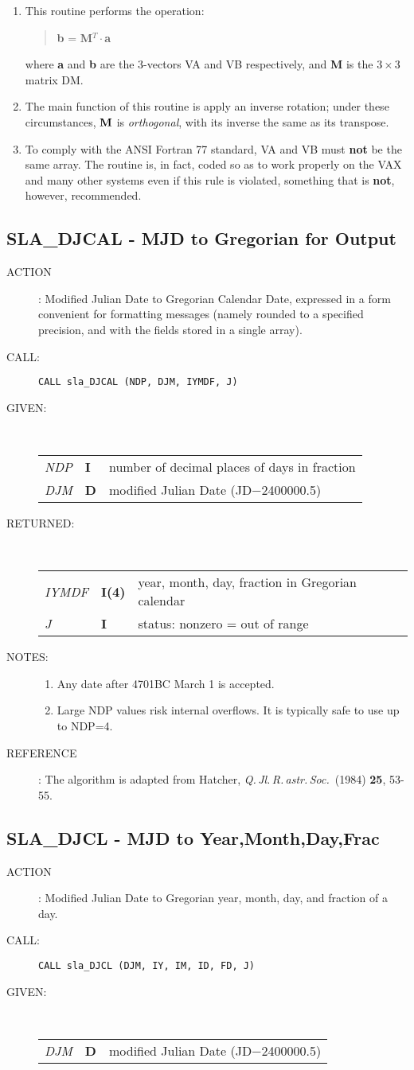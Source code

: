\documentclass[11pt,twoside]{article}
\newcommand{\xlabel}[1]{}
\newcommand{\routine}[3]
{\hbadness=10000
  \vbox
  {
    \rule{\textwidth}{0.3mm}\\
    {\Large {\bf #1} \hfill #2 \hfill {\bf #1}}\\
    \setlength{\oldspacing}{\topsep}
    \setlength{\topsep}{0.3ex}
    \begin{description}
      #3
    \end{description}
    \setlength{\topsep}{\oldspacing}
  }
}
\renewcommand{\routine}[3]
   {
      \subsection{#1\xlabel{#1} - #2\label{#1}}
       \begin{description}
         #3
       \end{description}
   }
\newcommand{\action}[1]
{\item[ACTION]: #1}
\newcommand{\action}[1]
   {\item[ACTION:] #1}
\newcommand{\call}[1]
{\item[CALL]: \hspace{0.4em}{\tt #1}}
\newlength{\oldspacing}
\renewcommand{\call}[1]
   {
    \item[CALL:] {\tt #1}
   }
\newcommand{\args}[2]
{
  \goodbreak
  \setlength{\oldspacing}{\topsep}
  \setlength{\topsep}{0.3ex}
  \begin{description}
  \item[#1]:\\[1.5ex]
    \begin{tabular}{p{7em}p{6em}p{22em}}
      #2
    \end{tabular}
  \end{description}
  \setlength{\topsep}{\oldspacing}
}
\renewcommand{\args}[2]
   {
     \begin{description}
        \item[#1:]\\
        \begin{tabular}{p{7em}p{6em}l}
           #2
        \end{tabular}
     \end{description}
   }
\newcommand{\spec}[3]
{
  {\em {#1}} & {\bf \mbox{#2}} & {#3}
}
\newcommand{\notes}[1]
{
  \goodbreak
  \setlength{\oldspacing}{\topsep}
  \setlength{\topsep}{0.3ex}
  \begin{description}
    \item[NOTES]:
        #1
  \end{description}
  \setlength{\topsep}{\oldspacing}
}
\renewcommand{\notes}[1]
   {
      \begin{description}
         \item[NOTES:]
            #1
      \end{description}
   }
\newcommand{\aref}[1]
{
  \goodbreak
  \setlength{\oldspacing}{\topsep}
  \setlength{\topsep}{0.3ex}
  \begin{description}
    \item[REFERENCE]:
        #1
  \end{description}
  \setlength{\topsep}{\oldspacing}
}
\newcommand{\aref}[1]
   {
     \begin{description}
       \item[REFERENCE:]
           #1
     \end{description}
   }
\begin{document}
{
 \begin{enumerate}
  \item This routine performs the operation:
        \begin{verse}
         {\bf b} = {\bf M}$^{T}\cdot${\bf a}
        \end{verse}
        where {\bf a} and {\bf b} are the 3-vectors VA and VB
        respectively, and  {\bf M} is the $3\times3$ matrix DM.
  \item The main function of this routine is apply an inverse
        rotation;  under these circumstances, ${\bf M}$ is
        {\it orthogonal}, with its inverse the same as its transpose.
  \item To comply with the ANSI Fortran 77 standard, VA and VB must
        {\bf not} be the same array.  The routine is, in fact, coded
        so as to work properly on the VAX and many other systems even
        if this rule is violated, something that is {\bf not}, however,
        recommended.
 \end{enumerate}
}
\routine{SLA\_DJCAL}{MJD to Gregorian for Output}
{
 \action{Modified Julian Date to Gregorian Calendar Date, expressed
         in a form convenient for formatting messages (namely
         rounded to a specified precision, and with the fields
         stored in a single array).}
 \call{CALL sla\_DJCAL (NDP, DJM, IYMDF, J)}
}
\args{GIVEN}
{
 \spec{NDP}{I}{number of decimal places of days in fraction} \\
 \spec{DJM}{D}{modified Julian Date (JD$-$2400000.5)}
}
\args{RETURNED}
{
 \spec{IYMDF}{I(4)}{year, month, day, fraction in Gregorian calendar} \\
 \spec{J}{I}{status:  nonzero = out of range}
}
\notes
{
 \begin{enumerate}
  \item Any date after 4701BC March 1 is accepted.
  \item Large NDP values risk internal overflows.  It is typically safe
        to use up to NDP=4.
 \end{enumerate}
}
\aref{The algorithm is adapted from Hatcher,
      {\it Q.\,Jl.\,R.\,astr.\,Soc.}\ (1984) {\bf 25}, 53-55.}
\routine{SLA\_DJCL}{MJD to Year,Month,Day,Frac}
{
 \action{Modified Julian Date to Gregorian year, month, day,
         and fraction of a day.}
 \call{CALL sla\_DJCL (DJM, IY, IM, ID, FD, J)}
}
\args{GIVEN}
{
 \spec{DJM}{D}{modified Julian Date (JD$-$2400000.5)}
}
\end{document}
